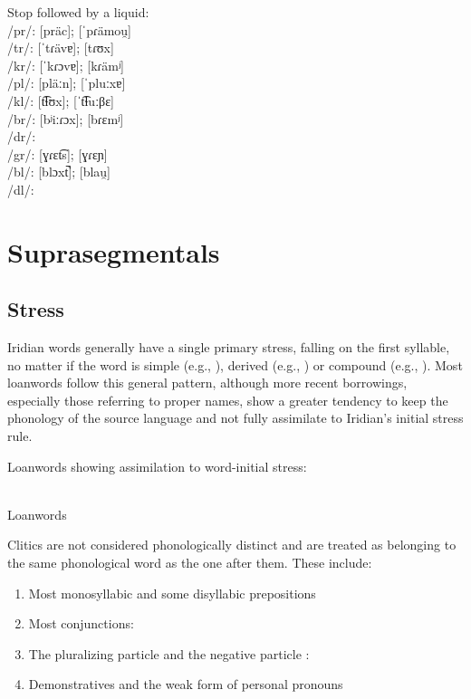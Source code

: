 \pex
\a Stop followed by a liquid:\\
/pr/:  [pr\"ac];  [ˈpɾämou̯]\\
/tr/:  [ˈtɾävɐ];  [tɾʊx]\\
/kr/:  [ˈkɾɔvɐ];  [kɾämʲ]\\
/pl/:  [pläːn];  [ˈpluːxɐ]\\
/kl/:  [t͡ɬʊx];  [ˈt͡ɬuːβɛ]\\
/br/:  [bʲiːɾɔx];  [bɾɛmʲ]\\
/dr/: \\
/gr/:  [ɣɾɛt͡s];  [ɣɾɛɲ]\\
/bl/:  [blɔxt̚];  [blau̯]\\
/dl/:
\xe

\section{Suprasegmentals}

\subsection{Stress} Iridian words generally have a single primary
stress, falling on the first syllable, no matter if the word is simple (e.g.,
), derived (e.g., ) or
compound (e.g., ). Most loanwords follow this
general pattern, although more recent borrowings, especially those referring to
proper names, show a greater tendency to keep the phonology of the source
language and not fully assimilate to Iridian's initial stress rule.

\pex
\a Loanwords showing assimilation to word-initial stress:\\
\\

\a Loanwords
\xe

Clitics are not considered phonologically distinct and are treated
as belonging to the same phonological word as the one after them. These include:

\begin{enumerate}[noitemsep,label=(\alph*)]
	\item Most monosyllabic and some disyllabic prepositions
	\item Most conjunctions:
	\item The pluralizing particle  and the negative particle
	: 
	\item Demonstratives and the weak form of personal pronouns
\end{enumerate}

